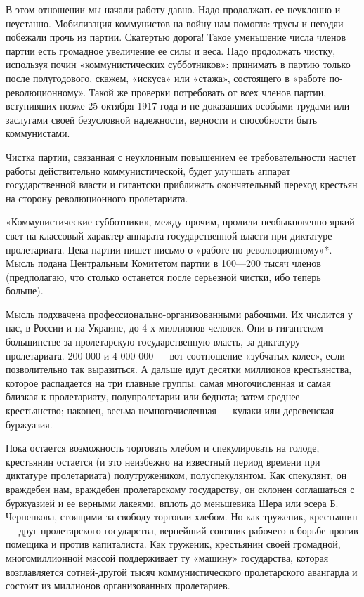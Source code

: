 \documentclass[12pt]{article}
\newcommand{\parnum}{(\arabic{parcount})}
\newcounter{parcount}
\newenvironment{parnumbers}{%
  \par%
  \everypar{\noindent \stepcounter{parcount}\marginpar[]{\parnum}}%
}{}
\begin{document}
\begin{parnumbers}
В этом отношении мы начали работу давно. Надо продолжать ее неуклонно и неустанно. Мобилизация коммунистов на войну нам помогла: трусы и негодяи побежали прочь из партии. Скатертью дорога! Такое уменьшение числа членов партии есть громадное увеличение ее силы и веса. Надо продолжать чистку, используя почин «коммунистических субботников»: принимать в партию только после полугодового, скажем, «искуса» или «стажа», состоящего в «работе по-революционному». Такой же проверки потребовать от всех членов партии, вступивших позже 25 октября 1917 года и не доказавших особыми трудами или заслугами своей безусловной надежности, верности и способности быть коммунистами.

Чистка партии, связанная с неуклонным повышением ее требовательности насчет работы действительно коммунистической, будет улучшать аппарат государственной власти и гигантски приближать окончательный переход крестьян на сторону революционного пролетариата.

«Коммунистические субботники», между прочим, пролили необыкновенно яркий свет на классовый характер аппарата государственной власти при диктатуре пролетариата. Цека партии пишет письмо о «работе по-революционному»*. Мысль подана Центральным Комитетом партии в 100—200 тысяч членов (предполагаю, что столько останется после серьезной чистки, ибо теперь больше).

Мысль подхвачена профессионально-организованными рабочими. Их числится у нас, в России и на Украине, до 4-х миллионов человек. Они в гигантском большинстве за пролетарскую государственную власть, за диктатуру пролетариата. 200 000 и 4 000 000 — вот соотношение «зубчатых колес», если позволительно так выразиться. А дальше идут десятки миллионов крестьянства, которое распадается на три главные группы: самая многочисленная и самая близкая к пролетариату, полупролетарии или беднота; затем среднее крестьянство; наконец, весьма немногочисленная — кулаки или деревенская буржуазия.

Пока остается возможность торговать хлебом и спекулировать на голоде, крестьянин остается (и это неизбежно на известный период времени при диктатуре пролетариата) полутружеником, полуспекулянтом. Как спекулянт, он враждебен нам, враждебен пролетарскому государству, он склонен соглашаться с буржуазией и ее верными лакеями, вплоть до меньшевика Шера или эсера Б. Черненкова, стоящими за свободу торговли хлебом. Но как труженик, крестьянин — друг пролетарского государства, вернейший союзник рабочего в борьбе против помещика и против капиталиста. Как труженик, крестьянин своей громадной, многомиллионной массой поддерживает ту «машину» государства, которая возглавляется сотней-другой тысяч коммунистического пролетарского авангарда и состоит из миллионов организованных пролетариев.


\end{parnumbers}
\end{document}
